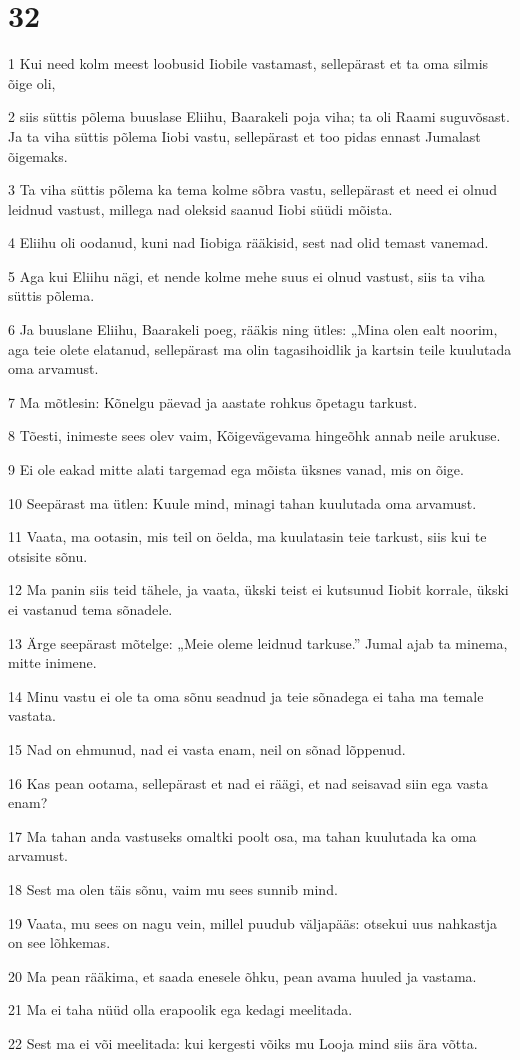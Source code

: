 \chapter{32}

\par 1 Kui need kolm meest loobusid Iiobile vastamast, sellepärast et ta oma silmis õige oli,
\par 2 siis süttis põlema buuslase Eliihu, Baarakeli poja viha; ta oli Raami suguvõsast. Ja ta viha süttis põlema Iiobi vastu, sellepärast et too pidas ennast Jumalast õigemaks.
\par 3 Ta viha süttis põlema ka tema kolme sõbra vastu, sellepärast et need ei olnud leidnud vastust, millega nad oleksid saanud Iiobi süüdi mõista.
\par 4 Eliihu oli oodanud, kuni nad Iiobiga rääkisid, sest nad olid temast vanemad.
\par 5 Aga kui Eliihu nägi, et nende kolme mehe suus ei olnud vastust, siis ta viha süttis põlema.
\par 6 Ja buuslane Eliihu, Baarakeli poeg, rääkis ning ütles: „Mina olen ealt noorim, aga teie olete elatanud, sellepärast ma olin tagasihoidlik ja kartsin teile kuulutada oma arvamust.
\par 7 Ma mõtlesin: Kõnelgu päevad ja aastate rohkus õpetagu tarkust.
\par 8 Tõesti, inimeste sees olev vaim, Kõigevägevama hingeõhk annab neile arukuse.
\par 9 Ei ole eakad mitte alati targemad ega mõista üksnes vanad, mis on õige.
\par 10 Seepärast ma ütlen: Kuule mind, minagi tahan kuulutada oma arvamust.
\par 11 Vaata, ma ootasin, mis teil on öelda, ma kuulatasin teie tarkust, siis kui te otsisite sõnu.
\par 12 Ma panin siis teid tähele, ja vaata, ükski teist ei kutsunud Iiobit korrale, ükski ei vastanud tema sõnadele.
\par 13 Ärge seepärast mõtelge: „Meie oleme leidnud tarkuse.” Jumal ajab ta minema, mitte inimene.
\par 14 Minu vastu ei ole ta oma sõnu seadnud ja teie sõnadega ei taha ma temale vastata.
\par 15 Nad on ehmunud, nad ei vasta enam, neil on sõnad lõppenud.
\par 16 Kas pean ootama, sellepärast et nad ei räägi, et nad seisavad siin ega vasta enam?
\par 17 Ma tahan anda vastuseks omaltki poolt osa, ma tahan kuulutada ka oma arvamust.
\par 18 Sest ma olen täis sõnu, vaim mu sees sunnib mind.
\par 19 Vaata, mu sees on nagu vein, millel puudub väljapääs: otsekui uus nahkastja on see lõhkemas.
\par 20 Ma pean rääkima, et saada enesele õhku, pean avama huuled ja vastama.
\par 21 Ma ei taha nüüd olla erapoolik ega kedagi meelitada.
\par 22 Sest ma ei või meelitada: kui kergesti võiks mu Looja mind siis ära võtta.

